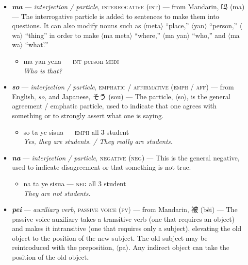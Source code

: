 \documentclass[a4paper, titlepage]{article}
\begin{document}
\begin{itemize}
	\begin{itemize}
		\item man tampien ale a yena meta a ke ni ale — \textsc{1sg} also go \textsc{loc medi} place \textsc{loc rel 2sg} go \\\textit{I have also been to that place you went to.}
		\item man le kome hafe yena naife pa ke ni kata keike — \textsc{1sg pst} come have \textsc{medi} knife \textsc{instr rel 2sg} cut cake \\\textit{I brought the knife with which you cut the cake.}
	\end{itemize}
	\item \textbf{\textit{ma}} —  \textit{interjection / particle}, \textsc{interrogative (int)} — from Mandarin, 吗 (ma) — The interrogative particle is added to sentences to make them into questions. It can also modify nouns such as $\langle$meta$\rangle$ ``place,'' $\langle$yan$\rangle$ ``person,'' $\langle$wa$\rangle$ ``thing'' in order to make $\langle$ma meta$\rangle$ ``where,'' $\langle$ma yan$\rangle$ ``who,'' and $\langle$ma wa$\rangle$ ``what'.''
	\begin{itemize}
		\item ma yan yena — \textsc{int} person \textsc{medi} \\\textit{Who is that?}
	\end{itemize}
	\item \textbf{\textit{so}} — \textit{interjection / particle}, \textsc{emphatic / affirmative (emph / aff)} — from English, \textit{so}, and Japanese, そう (sou) — The particle, $\langle$so$\rangle$, is the general agreement / emphatic particle, used to indicate that one agrees with something or to strongly assert what one is saying.
	\begin{itemize}
		\item so ta ye sisua — \textsc{emph} all 3 student \\\textit{Yes, they are students. / They really are students.}
	\end{itemize}
	\item \textbf{\textit{na}} — \textit{interjection / particle}, \textsc{negative (neg)} — This is the general negative, used to indicate disagreement or that something is not true.
	\begin{itemize}
		\item na ta ye sisua — \textsc{neg} all 3 student \\\textit{They are not students.}
	\end{itemize}
	\item \textbf{\textit{pei}} — \textit{auxiliary verb}, \textsc{passive voice (pv)}  — from Mandarin, 被 (bèi) — The passive voice auxiliary takes a transitive verb (one that requires an object) and makes it intransitive (one that requires only a subject), elevating the old object to the position of the new subject. The old subject may be reintroduced with the preposition, $\langle$pa$\rangle$. Any indirect object can take the position of the old object.

\end{itemize}
\end{document}
